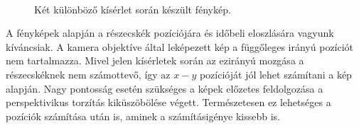 	\begin{figure}[!ht]
		\centering
		\\
		\caption{Két különböző kísérlet során készült fénykép.}
		\label{fig:captures}
	\end{figure}
	
	A fényképek alapján a részecskék pozíciójára és időbeli eloszlására vagyunk kíváncsiak.
	A kamera objektíve által leképezett kép a függőleges irányú pozíciót nem tartalmazza. Mivel jelen
	kísérletek során az ezirányú mozgása a részecskéknek nem számottevő, így az $x-y$ pozícióját jól
	lehet számítani a kép alapján. Nagy pontosság esetén szükséges a képek előzetes feldolgozása a
	perspektivikus torzítás kiküszöbölése végett. Természetesen ez lehetséges a pozíciók számítása után
	is, aminek a számításigénye kissebb is.



